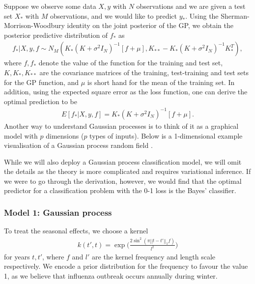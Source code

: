 \documentclass[letterpaper,10pt,english]{sphinxmanual}
\begin{document}
Suppose we observe some data \(X,y\) with \(N\) observations and we are given a
test set \(X_*\) with \(M\) observations,  and we would like to predict \(y_*\).
Using the  Sherman-Morrison-Woodbury identity on the joint posterior of the GP,
we obtain the posterior predictive distribution of \(f_*\) as \sphinxfootnotemark[6]
\begin{equation*}
\begin{split}f_*| X,y,f\sim N_M(K_*(K + \sigma^2I_N)^{-1}[f + \mu], K_{**} - K_*(K + \sigma^2I_N)^{-1}K_*^T),\end{split}
\end{equation*}
where \(f, f_*\) denote the value of the function for the training and test set, \(K, K_*,K_{**}\) are the covariance matrices of the training, test-training and
test sets for the GP function, and \(\mu\) is short hand for the mean of the training set.
In addition, using the expected square error as the loss function, one can derive the optimal prediction to be \sphinxfootnotemark[6]
\begin{equation*}
\begin{split}E[f_*| X,y,f] = K_*(K + \sigma^2I_N)^{-1}[f + \mu].\end{split}
\end{equation*}
Another way to understand Gaussian processes is to think of it as a graphical model with \(p\) dimensions (\(p\) types of inputs). Below is a
1-dimensional example visualisation of a Gaussian process random field \sphinxfootnotemark[6].

\noindent{}

While we will also deploy a Gaussian process classification model, we will omit the details as the theory is more complicated and requires variational inference. If we were to go through the derivation, however, we would find that the optimal predictor for a classification problem with the 0-1 loss is the Bayes’ classifier.


\subsubsection{Model 1: Gaussian process}
\label{\detokenize{models/when:model-1-gaussian-process}}
To treat the seasonal effects, we choose a kernel
\begin{equation*}
\begin{split}k(t', t) =  \exp\Bigg(\frac{2\sin^2(\pi||t-t'||_1 f)}{l^2} \Bigg)\end{split}
\end{equation*}
for years \(t,t'\), where \(f\) and \(l'\) are the kernel frequency and length scale respectively. We encode a prior distribution
for the frequency to favour the value 1, as we believe that influenza outbreak occurs annually during winter.
\end{document}
